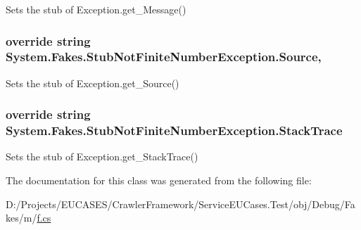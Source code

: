 Sets the stub of Exception.\-get\-\_\-\-Message()

\hypertarget{class_system_1_1_fakes_1_1_stub_not_finite_number_exception_aec9453989f2e7236397b5c8459a80f0e}{
\subsubsection[{Source}]{\setlength{\rightskip}{0pt plus 5cm}override string System.\-Fakes.\-Stub\-Not\-Finite\-Number\-Exception.\-Source\hspace{0.3cm}{\ttfamily [get]}, {\ttfamily [set]}}}\label{class_system_1_1_fakes_1_1_stub_not_finite_number_exception_aec9453989f2e7236397b5c8459a80f0e}


Sets the stub of Exception.\-get\-\_\-\-Source()

\hypertarget{class_system_1_1_fakes_1_1_stub_not_finite_number_exception_ae358d3703c7e7df92e5dacb5afd02fda}{
\subsubsection[{Stack\-Trace}]{\setlength{\rightskip}{0pt plus 5cm}override string System.\-Fakes.\-Stub\-Not\-Finite\-Number\-Exception.\-Stack\-Trace\hspace{0.3cm}{\ttfamily [get]}}}\label{class_system_1_1_fakes_1_1_stub_not_finite_number_exception_ae358d3703c7e7df92e5dacb5afd02fda}


Sets the stub of Exception.\-get\-\_\-\-Stack\-Trace()



The documentation for this class was generated from the following file\-:\begin{DoxyCompactItemize}
\item 
D\-:/\-Projects/\-E\-U\-C\-A\-S\-E\-S/\-Crawler\-Framework/\-Service\-E\-U\-Cases.\-Test/obj/\-Debug/\-Fakes/m/\hyperlink{m_2f_8cs}{f.\-cs}\end{DoxyCompactItemize}

